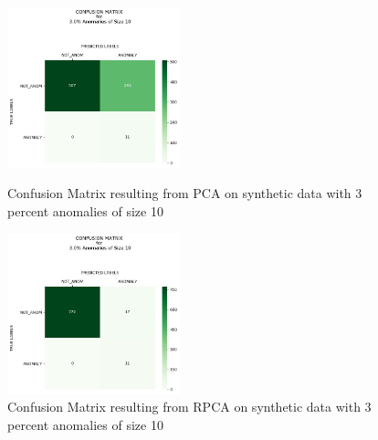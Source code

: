 \documentclass[conference]{IEEEtran}
\begin{document}
\begin{figure}[H]
\begin{minipage}[b]{0.45\linewidth}
    \centering

    \includegraphics[width=50mm, scale=0.5]{cmPCATest_120AnomSize10.jpg}
    \caption{Confusion Matrix resulting from PCA on synthetic data with 3 percent anomalies of size 10}
    \label{fig::CMtrainPCA12010}
\end{minipage}
\quad
\begin{minipage}[b]{0.45\linewidth}
    \centering
    \includegraphics[width=50mm, scale=0.5]{cmRPCATest_120AnomSize10.jpg}
    \caption{Confusion Matrix resulting from RPCA on synthetic data with 3 percent anomalies of size 10}
    \label{fig::CMtrainRPCA12010}
\end{minipage}
\end{figure}

\end{document}
